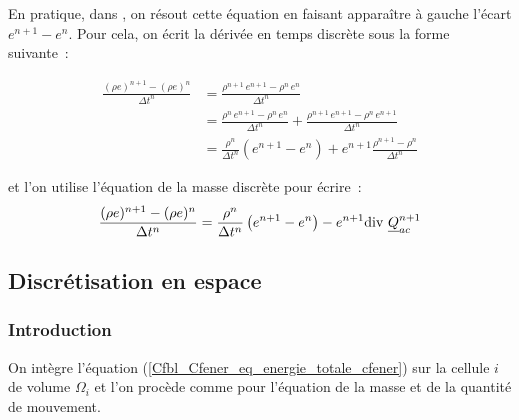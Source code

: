 En pratique, dans \CS, on r\'esout cette \'equation en faisant appara\^itre \`a
gauche l'\'ecart $e^{n+1} - e^n$. Pour cela, on \'ecrit la d\'eriv\'ee
en temps discr\`ete sous la forme suivante~:

\begin{equation}
\begin{array}{ll}
\displaystyle
\frac{(\rho e)^{n+1} - (\rho e)^n}{\Delta t^n}
& =
\displaystyle
\frac{\rho^{n+1}\, e^{n+1} - \rho^n\, e^n}{\Delta t^n}\\
& =
\displaystyle
\frac{\rho^{n}\, e^{n+1} - \rho^n\, e^n}{\Delta t^n}+
\frac{\rho^{n+1}\, e^{n+1} - \rho^n\, e^{n+1}}{\Delta t^n}\\
& =
\displaystyle
\frac{\rho^{n}}{\Delta t^n}\left(e^{n+1} - e^n\right)+
e^{n+1}\frac{\rho^{n+1} - \rho^n}{\Delta t^n}
\end{array}
\end{equation}

et l'on utilise l'\'equation de la masse discr\`ete pour \'ecrire~:
\begin{equation}
\displaystyle
\frac{(\rho e)^{n+1} - (\rho e)^n}{\Delta t^n}
=
\frac{\rho^{n}}{\Delta t^n}\left(e^{n+1} - e^n\right)-
e^{n+1}\text{div}\,\,\underline{Q}_{ac}^{n+1}
\end{equation}



\subsection*{Discr\'etisation en espace}


\subsubsection*{Introduction}

On int\`egre l'\'equation (\ref{Cfbl_Cfener_eq_energie_totale_cfener})
sur la cellule $i$ de volume $\Omega_i$ et l'on proc\`ede comme
pour l'\'equation de la masse et de la quantit\'e de mouvement.

